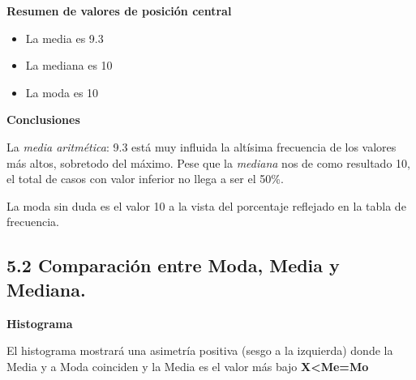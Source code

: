 \documentclass[
]{article}
\newenvironment{Shaded}{\begin{snugshade}}{\end{snugshade}}
\newcommand{\AttributeTok}[1]{\textcolor[rgb]{0.13,0.29,0.53}{#1}}
\newcommand{\CommentTok}[1]{\textcolor[rgb]{0.56,0.35,0.01}{\textit{#1}}}
\newcommand{\DecValTok}[1]{\textcolor[rgb]{0.00,0.00,0.81}{#1}}
\newcommand{\FunctionTok}[1]{\textcolor[rgb]{0.13,0.29,0.53}{\textbf{#1}}}
\newcommand{\NormalTok}[1]{#1}
\newcommand{\OtherTok}[1]{\textcolor[rgb]{0.56,0.35,0.01}{#1}}
\newcommand{\SpecialCharTok}[1]{\textcolor[rgb]{0.81,0.36,0.00}{\textbf{#1}}}
\newcommand{\StringTok}[1]{\textcolor[rgb]{0.31,0.60,0.02}{#1}}
\providecommand{\tightlist}{%
  \setlength{\itemsep}{0pt}\setlength{\parskip}{0pt}}
\begin{document}
\textbf{Resumen de valores de posición central}

\begin{itemize}
\tightlist
\item
  La media es 9.3
\item
  La mediana es 10
\item
  La moda es 10
\end{itemize}

\textbf{Conclusiones}

La \emph{media aritmética}: 9.3 está muy influida la altísima frecuencia
de los valores más altos, sobretodo del máximo. Pese que la
\emph{mediana} nos de como resultado 10, el total de casos con valor
inferior no llega a ser el 50\%.

La moda sin duda es el valor 10 a la vista del porcentaje reflejado en
la tabla de frecuencia.

\hypertarget{comparaciuxf3n-entre-moda-media-y-mediana.}{%
\subsection{5.2 Comparación entre Moda, Media y
Mediana.}\label{comparaciuxf3n-entre-moda-media-y-mediana.}}

\textbf{Histograma}

El histograma mostrará una asimetría positiva (sesgo a la izquierda)
donde la Media y a Moda coinciden y la Media es el valor más bajo
\textbf{X\textless Me=Mo}

\begin{Shaded}
\end{Shaded}
\end{document}
